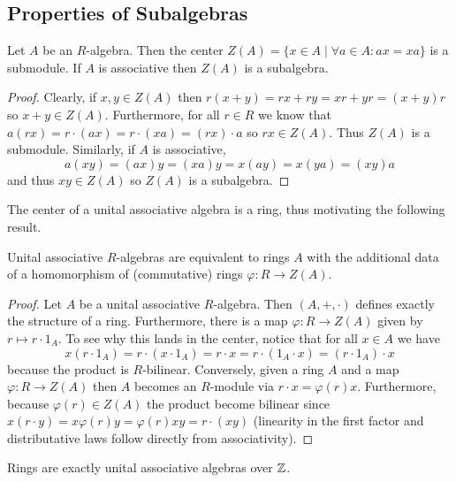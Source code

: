 \documentclass[12pt]{extarticle}
\begin{document}
\subsection{Properties of Subalgebras}

\begin{prop}
Let $A$ be an $R$-algebra. Then the center $Z(A) = \{ x \in A \mid \forall a \in A : a x = x a \}$ is a submodule. If $A$ is associative then $Z(A)$ is a subalgebra. 
\end{prop}

\begin{proof}
Clearly, if $x, y \in Z(A)$ then $r(x + y) = r x + ry = xr + yr = (x + y)r$ so $x + y \in Z(A)$. Furthermore, for all $r \in R$ we know that $a(rx) = r \cdot (ax) = r \cdot (xa) = (r x) \cdot a$ so $r x \in Z(A)$. Thus $Z(A)$ is a submodule. Similarly, if $A$ is associative, 
\[ a (xy) = (ax)y = (xa)y = x(ay) = x(ya) = (xy)a \]
and thus $xy \in Z(A)$ so $Z(A)$ is a subalgebra.
\end{proof}

\begin{rmk}
The center of a unital associative algebra is a ring, thus motivating the following result.
\end{rmk}

\begin{prop}
Unital associative $R$-algebras are equivalent to rings $A$ with the additional data of a homomorphism of (commutative) rings $\varphi : R \to Z(A)$.
\end{prop}

\begin{proof}
Let $A$ be a unital associative $R$-algebra. Then $(A, +, \cdot)$ defines exactly the structure of a ring. Furthermore, there is a map $\varphi : R \to Z(A)$ given by $r \mapsto r \cdot 1_A$. To see why this lands in the center, notice that for all $x \in A$ we have 
\[ x (r \cdot 1_A) = r \cdot (x \cdot 1_A) = r \cdot x = r \cdot (1_A \cdot x) = (r \cdot 1_A) \cdot x \]
because the product is $R$-bilinear. Conversely, given a ring $A$ and a map $\varphi : R \to Z(A)$ then $A$ becomes an $R$-module via $r \cdot x = \varphi(r)x$. Furthermore, because $\varphi(r) \in Z(A)$ the product become bilinear since $x (r \cdot y) = x \varphi(r) y = \varphi(r) xy = r \cdot (xy)$ (linearity in the first factor and distributative laws follow directly from associativity). 
\end{proof}

\begin{cor}
Rings are exactly unital associative algebras over $\mathbb{Z}$.
\end{cor}
\end{document}
